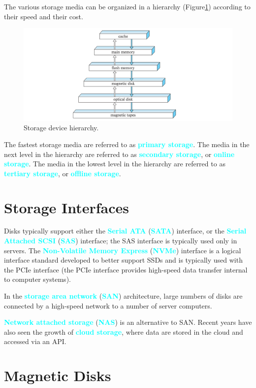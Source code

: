 \documentclass[a4paper,12pt,twoside,openany]{book}
\newcommand{\textcy}[1]{\textbf{\textcolor{cyan}{#1}}}
\begin{document}
The various storage media can be organized in a hierarchy (Figure\;\ref{Figure:12.1}) according to their speed and their cost.
\begin{figure}[htbp]
    \centering
    \includegraphics[width=\linewidth]{Figure12.1.png}
    \caption{Storage device hierarchy.}
    \label{Figure:12.1}
\end{figure}

The fastest storage media are referred to as \textcy{primary storage}. The media in the next level in the hierarchy are referred to as \textcy{secondary storage}, or \textcy{online storage}. The media in the lowest level in the hierarchy are referred to as \textcy{tertiary storage}, or \textcy{offline storage}.

\section{Storage Interfaces}

Disks typically support either the \textcy{Serial ATA} (\textcy{SATA}) interface, or the \textcy{Serial Attached SCSI} (\textcy{SAS}) interface; the SAS interface is typically used only in servers. The \textcy{Non-Volatile Memory Express} (\textcy{NVMe}) interface is a logical interface standard developed to better support SSDs and is typically used with the PCIe interface (the PCIe interface provides high-speed data transfer internal to computer systems).

In the \textcy{storage area network} (\textcy{SAN}) architecture, large numbers of disks are connected by a high-speed network to a number of server computers.

\textcy{Network attached storage} (\textcy{NAS}) is an alternative to SAN. Recent years have also seen the growth of \textcy{cloud storage}, where data are stored in the cloud and accessed via an API.

\section{Magnetic Disks}
\end{document}
